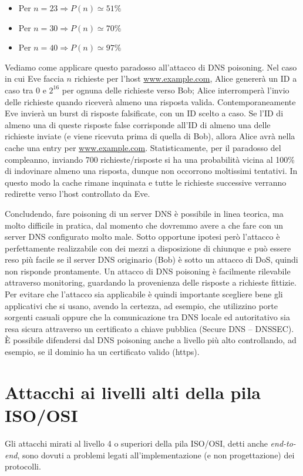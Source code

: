 \begin{itemize}
	\item Per $n=23 \Longrightarrow P(n) \simeq 51\%$
	\item Per $n=30 \Longrightarrow P(n) \simeq 70\%$
	\item Per $n=40 \Longrightarrow P(n) \simeq 97\%$
\end{itemize}
Vediamo come applicare questo paradosso all'attacco di DNS poisoning. Nel caso in cui Eve faccia $n$ richieste per l'host \url{www.example.com}, Alice genererà un ID a caso tra 0 e $2^{16}$ per ognuna delle richieste verso Bob; Alice interromperà
l'invio delle richieste quando riceverà almeno una risposta valida. Contemporaneamente Eve invierà un burst di risposte falsificate, con un ID scelto a caso. Se l'ID di almeno una di queste risposte false corrisponde all'ID di almeno una delle richieste inviate (e viene ricevuta prima di quella di Bob), allora Alice avrà nella cache una entry per \url{www.example.com}. Statisticamente, per il paradosso del compleanno, inviando 700 richieste/risposte si ha una probabilità vicina al 100\% di indovinare almeno una risposta, dunque non occorrono moltissimi tentativi. In questo modo la cache rimane inquinata e tutte le richieste successive verranno redirette verso l'host controllato da Eve.

Concludendo, fare poisoning di un server DNS è possibile in linea teorica, ma molto difficile in pratica, dal momento che dovremmo avere a che fare con un server DNS configurato molto male. Sotto opportune ipotesi però l'attacco è perfettamente realizzabile con dei mezzi a disposizione di chiunque e può essere reso più facile se il server DNS originario (Bob) è sotto un attacco di DoS, quindi non risponde prontamente. Un attacco di DNS poisoning è facilmente rilevabile attraverso monitoring, guardando la provenienza delle risposte a richieste fittizie. Per evitare che l'attacco sia applicabile è quindi importante scegliere bene gli applicativi che si usano, avendo la certezza, ad esempio, che utilizzino porte sorgenti casuali oppure che la comunicazione tra DNS locale ed autoritativo sia resa sicura attraverso un certificato a chiave pubblica (Secure DNS -- DNSSEC).\\
È possibile difendersi dal DNS poisoning anche a livello più alto controllando, ad esempio, se il dominio ha un certificato valido (https).

\section{Attacchi ai livelli alti della pila ISO/OSI}
Gli attacchi mirati al livello 4 o superiori della pila ISO/OSI, detti anche \textit{end-to-end}, sono dovuti a problemi legati all'implementazione (e non progettazione) dei protocolli.

